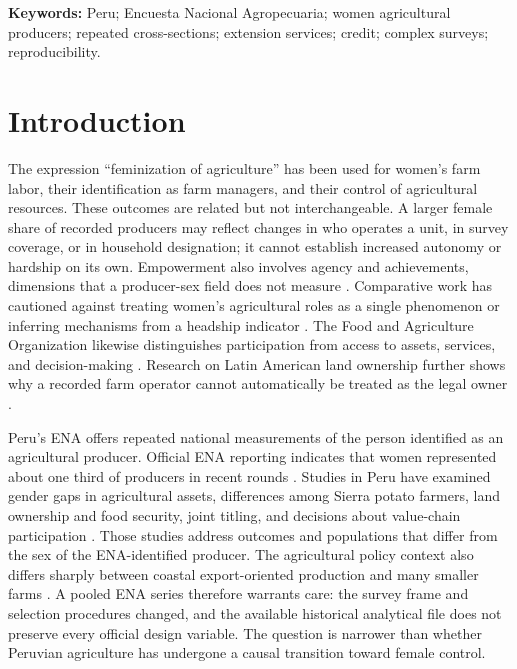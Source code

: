 \documentclass[11pt,a4paper]{article}
\begin{document}
\noindent\textbf{Keywords:} Peru; Encuesta Nacional Agropecuaria; women agricultural producers; repeated cross-sections; extension services; credit; complex surveys; reproducibility.

\section{Introduction}
The expression ``feminization of agriculture'' has been used for women's farm labor, their identification as farm managers, and their control of agricultural resources. These outcomes are related but not interchangeable. A larger female share of recorded producers may reflect changes in who operates a unit, in survey coverage, or in household designation; it cannot establish increased autonomy or hardship on its own. Empowerment also involves agency and achievements, dimensions that a producer-sex field does not measure \cite{kabeer1999}. Comparative work has cautioned against treating women's agricultural roles as a single phenomenon or inferring mechanisms from a headship indicator \cite{deere2005,doss2018,kawarazuka2022,leder2022}. The Food and Agriculture Organization likewise distinguishes participation from access to assets, services, and decision-making \cite{fao2023}. Research on Latin American land ownership further shows why a recorded farm operator cannot automatically be treated as the legal owner \cite{deereleon2003}.

Peru's ENA offers repeated national measurements of the person identified as an agricultural producer. Official ENA reporting indicates that women represented about one third of producers in recent rounds \cite{inei2022,ineigender2025,inei2025results}. Studies in Peru have examined gender gaps in agricultural assets, differences among Sierra potato farmers, land ownership and food security, joint titling, and decisions about value-chain participation \cite{delpozo2016,patel2018,schling2024,wiig2013,tobin2022}. Those studies address outcomes and populations that differ from the sex of the ENA-identified producer. The agricultural policy context also differs sharply between coastal export-oriented production and many smaller farms \cite{oecd2026}. A pooled ENA series therefore warrants care: the survey frame and selection procedures changed, and the available historical analytical file does not preserve every official design variable. The question is narrower than whether Peruvian agriculture has undergone a causal transition toward female control.
\end{document}
